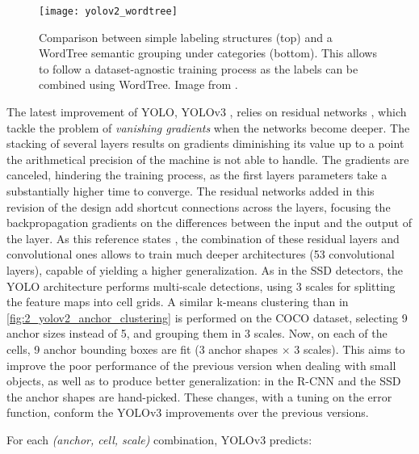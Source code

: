 \begin{figure}[h]
	\centering
	\texttt{[image: yolov2\_wordtree]}
	\caption{Comparison between simple labeling structures (top) and a WordTree semantic grouping under categories (bottom). This allows to follow a dataset-agnostic training process as the labels can be combined using WordTree. Image from \cite{yolov2}.}
	\label{fig:2_yolov2_wordtree}
\end{figure}




The latest improvement of YOLO, YOLOv3 \cite{yolov3}, relies on residual networks \cite{resnets}, which tackle the problem of \textit{vanishing gradients} when the networks become deeper. The stacking of several layers results on gradients diminishing its value up to a point the arithmetical precision of the machine is not able to handle. The gradients are canceled, hindering the training process, as the first layers parameters take a substantially higher time to converge. The residual networks added in this revision of the design add shortcut connections across the layers, focusing the backpropagation gradients on the differences between the input and the output of the layer. As this reference states \cite{yolov3}, the combination of these residual layers and convolutional ones allows to train much deeper architectures (53 convolutional layers), capable of yielding a higher generalization. As in the SSD detectors, the YOLO architecture performs multi-scale detections, using 3 scales for splitting the feature maps into cell grids. A similar k-means clustering than in \autoref{fig:2_yolov2_anchor_clustering} is performed on the COCO dataset, selecting 9 anchor sizes instead of 5, and grouping them in 3 scales. Now, on each of the cells, 9 anchor bounding boxes are fit (3 anchor shapes $\times$ 3 scales). This aims to improve the poor performance of the previous version when dealing with small objects, as well as to produce better generalization: in the R-CNN \cite{rcnn} and the SSD \cite{ssd} the anchor shapes are hand-picked. These changes, with a tuning on the error function, conform the YOLOv3 improvements over the previous versions.\\

\vspace{5cm}

For each \textit{(anchor, cell, scale)} combination, YOLOv3 predicts:

